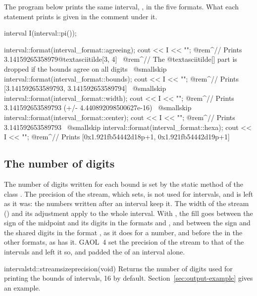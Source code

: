 \begin{Ex}
The program below prints the same interval, , in the
five formats. What each statement prints is given in the comment under it.
\begin{example}
interval I(interval::pi());

interval::format(interval_format::agreeing);
cout << I << "\n";
@rem^// Prints 3.14159265358979@textasciitilde[3, 4]~
@rem^// The @textasciitilde[] part is dropped if the bounds agree on all digits~
@smallskip
interval::format(interval_format::bounds);
cout << I << "\n";
@rem^// Prints [3.141592653589793, 3.141592653589794]~
@smallskip
interval::format(interval_format::width);
cout << I << "\n";
@rem^// Prints 3.141592653589793 (+/- 4.440892098500627e-16)~
@smallskip
interval::format(interval_format::center);
cout << I << "\n";
@rem^// Prints 3.141592653589793~
@smallskip
interval::format(interval_format::hexa);
cout << I << "\n";
@rem^// Prints [0x1.921fb54442d18p+1, 0x1.921fb54442d19p+1]~
\end{example}
\end{Ex}

\subsection{The number of digits}

The number of digits written for each bound is set by the static method
 of the class . The precision of the
stream, which  sets, is not used for intervals, and
is left as it was: the numbers written after an interval keep it. The width
of the stream () and its adjustment apply to the whole
interval. With , the fill goes between the sign of the
midpoint and its digits in the formats  and ,
and between the sign and the shared digits in the format ,
as it does for a number, and before the \code{[} in the other formats, as
 has it.\newinvfive{} GAOL~4 set the precision of the
stream to that of the intervals and left it so, and  padded
the \code{[} of an interval alone.
%

\begin{defstaticmethod}{interval}{std::streamsize}{precision}{(void)}
  Returns the number of digits used for printing the bounds of intervals,
  16 by default. Section~\ref{sec:output-example} gives an example.
\end{defstaticmethod}

